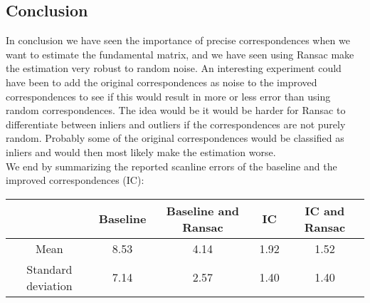 \subsection{Conclusion}
In conclusion we have seen the importance of precise correspondences when we want to estimate the fundamental matrix, and we have seen using Ransac make the estimation very robust to random noise. An interesting experiment could have been to add the original correspondences as noise to the improved correspondences to see if this would result in more or less error than using random correspondences. The idea would be it would be harder for Ransac to differentiate between inliers and outliers if the correspondences are not purely random. Probably some of the original correspondences would be classified as inliers and would then most likely make the estimation worse.\\
We end by summarizing the reported scanline errors of the baseline and the improved correspondences (IC):
\begin{table}[h]
	\centering
	\begin{tabular}{|c|c|c|c|c|}\hline
									 &Baseline & Baseline and Ransac & IC 		&IC and Ransac\\\hline
		Mean					 &8.53	    & 4.14							& 1.92	 &1.52				  \\\hline
		Standard deviation&7.14		  & 2.57						  &1.40	   &1.40		        \\\hline
	\end{tabular}
\end{table}